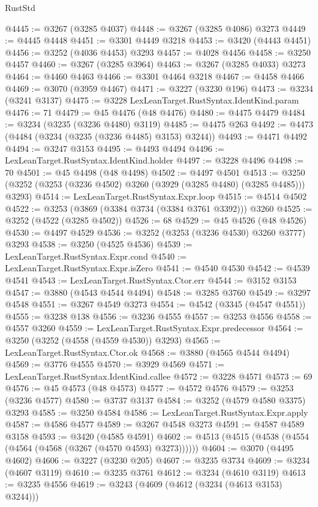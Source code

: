 \begin{lexlean}{RustStd}
\begin{coremodule}
{\begin{coremodule}
{{{{{{{{{{{{{{{{{{{{{{{{{{{{{{{{{{{{{{{@4445 := @3267 (@3285 @4037)
@4448 := @3267 (@3285 @4086) @3273
@4449 := @4445 @4448
@4451 := @3301 @4449 @3218
@4453 := @3420 (@4443 @4451)
@4456 := @3252 (@4036 @4453) @3293
@4457 := @4028 @4456
@4458 := @3250 @4457
@4460 := @3267 (@3285 @3964)
@4463 := @3267 (@3285 @4033) @3273
@4464 := @4460 @4463
@4466 := @3301 @4464 @3218
@4467 := @4458 @4466
@4469 := @3070 (@3959 @4467)
@4471 := @3227 (@3230 @196)
@4473 := @3234 (@3241 @3137)
@4475 := @3228 LexLeanTarget.RustSyntax.IdentKind.param
@4476 := 71
@4479 := @45 @4476 (@48 @4476)
@4480 := @4475 @4479
@4484 := @3234 (@3235 (@3236 @4480) @3119)
@4485 := @4475 @263
@4492 := @4473 (@4484 (@3234 (@3235 (@3236 @4485) @3153) @3244))
@4493 := @4471 @4492
@4494 := @3247 @3153
@4495 := @4493 @4494
@4496 := LexLeanTarget.RustSyntax.IdentKind.holder
@4497 := @3228 @4496
@4498 := 70
@4501 := @45 @4498 (@48 @4498)
@4502 := @4497 @4501
@4513 := @3250 (@3252 (@3253 (@3236 @4502) @3260 (@3929 (@3285 @4480) (@3285 @4485))) @3293)
@4514 := LexLeanTarget.RustSyntax.Expr.loop
@4515 := @4514 @4502
@4522 := @3253 (@3869 (@3384 @3734 (@3384 @3761 @3392))) @3260
@4525 := @3252 (@4522 (@3285 @4502))
@4526 := 68
@4529 := @45 @4526 (@48 @4526)
@4530 := @4497 @4529
@4536 := @3252 (@3253 (@3236 @4530) @3260 @3777) @3293
@4538 := @3250 (@4525 @4536)
@4539 := LexLeanTarget.RustSyntax.Expr.cond
@4540 := LexLeanTarget.RustSyntax.Expr.isZero
@4541 := @4540 @4530
@4542 := @4539 @4541
@4543 := LexLeanTarget.RustSyntax.Ctor.err
@4544 := @3152 @3153
@4547 := @3880 (@4543 @4544 @4494)
@4548 := @3285 @3760
@4549 := @3297 @4548
@4551 := @3267 @4549 @3273
@4554 := @4542 (@3345 (@4547 @4551))
@4555 := @3238 @138
@4556 := @3236 @4555
@4557 := @3253 @4556
@4558 := @4557 @3260
@4559 := LexLeanTarget.RustSyntax.Expr.predecessor
@4564 := @3250 (@3252 (@4558 (@4559 @4530)) @3293)
@4565 := LexLeanTarget.RustSyntax.Ctor.ok
@4568 := @3880 (@4565 @4544 @4494)
@4569 := @3776 @4555
@4570 := @3929 @4569
@4571 := LexLeanTarget.RustSyntax.IdentKind.callee
@4572 := @3228 @4571
@4573 := 69
@4576 := @45 @4573 (@48 @4573)
@4577 := @4572 @4576
@4579 := @3253 (@3236 @4577)
@4580 := @3737 @3137
@4584 := @3252 (@4579 @4580 @3375) @3293
@4585 := @3250 @4584
@4586 := LexLeanTarget.RustSyntax.Expr.apply
@4587 := @4586 @4577
@4589 := @3267 @4548 @3273
@4591 := @4587 @4589 @3158
@4593 := @3420 (@4585 @4591)
@4602 := @4513 (@4515 (@4538 (@4554 (@4564 (@4568 (@3267 (@4570 @4593) @3273))))))
@4604 := @3070 (@4495 @4602)
@4606 := @3227 (@3230 @205)
@4607 := @3235 @3734
@4609 := @3234 (@4607 @3119)
@4610 := @3235 @3761
@4612 := @3234 (@4610 @3119)
@4613 := @3235 @4556
@4619 := @3243 (@4609 (@4612 (@3234 (@4613 @3153) @3244)))
}}}}}}}}}}}}}}}}}}}}}}}}}}}}}}}}}}}}}}}
\end{coremodule}}
\end{coremodule}
\end{lexlean}
